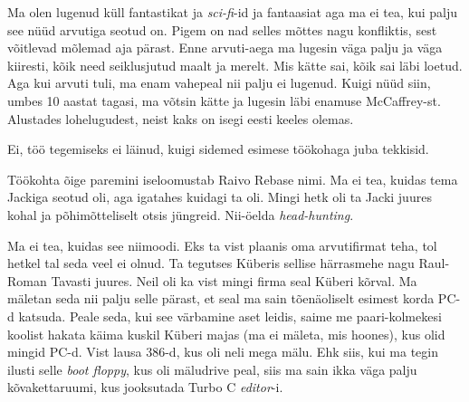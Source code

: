 
Ma olen lugenud küll fantastikat ja \emph{sci-fi}-id ja fantaasiat aga ma ei 
tea, kui palju see nüüd arvutiga seotud on. Pigem on nad selles mõttes nagu 
konfliktis, sest  võitlevad mõlemad aja pärast. Enne arvuti-aega ma lugesin 
väga palju ja väga kiiresti, kõik need seiklusjutud maalt ja merelt. Mis  kätte 
sai, kõik sai läbi loetud. Aga kui arvuti tuli,  ma enam vahepeal nii palju ei 
lugenud. Kuigi nüüd siin, umbes 10 aastat tagasi, ma võtsin kätte ja lugesin 
läbi enamuse  McCaffrey-st. Alustades lohelugudest, neist kaks on isegi eesti keeles olemas.

                 
Ei, töö tegemiseks ei läinud, kuigi  sidemed esimese töökohaga juba tekkisid.


Töökohta õige paremini iseloomustab Raivo Rebase 
nimi. Ma ei tea, kuidas tema Jackiga seotud oli, aga igatahes kuidagi ta oli. 
Mingi hetk oli ta Jacki juures kohal ja põhimõtteliselt otsis jüngreid. 
Nii-öelda \emph{head-hunting}.


Ma ei tea, kuidas see niimoodi. Eks ta vist plaanis  oma arvutifirmat teha, tol 
hetkel tal seda veel ei olnud. Ta tegutses Küberis sellise 
härrasmehe nagu Raul-Roman Tavasti  juures. Neil 
oli ka vist mingi firma seal Küberi kõrval. Ma mäletan seda nii palju selle 
pärast, et seal ma sain tõenäoliselt esimest korda PC-d katsuda. Peale seda, 
kui see värbamine aset leidis, saime me paari-kolmekesi koolist hakata  käima 
kuskil Küberi majas (ma ei mäleta, mis hoones), kus olid mingid PC-d. Vist 
lausa 386-d, kus oli neli mega mälu. Ehk siis, kui ma tegin ilusti selle 
\emph{boot floppy}, kus oli mäludrive peal, siis ma sain ikka väga palju 
kõvakettaruumi, kus jooksutada Turbo C \emph{editor}-i.
                 
